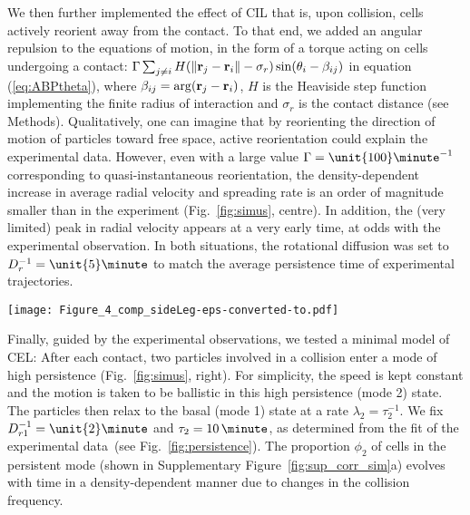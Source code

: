 \documentclass[11pt, twocolumn]{article}
\renewcommand\vec[1]{{\bf #1}}
\newcommand\rev[1]{{#1}}
\begin{document}
We then further implemented the effect of CIL that is, upon collision,
cells actively reorient away from the contact. To that end, we added
an angular repulsion to the equations of motion, in the form of a
torque \rev{acting on cells undergoing a contact:
  $\Gamma \sum_{j\neq i}H(\|\vec r_{j} - \vec
  r_{i}\|-\sigma_r)\sin(\theta_{i}-\beta_{ij})$
  in equation (\ref{eq:ABPtheta}), where
  $\beta_{ij}=\arg(\vec r_{j} - \vec r_{i})$, $H$ is the Heaviside
  step function implementing the finite radius of interaction
  and $\sigma_r$ is the contact distance (see Methods).} Qualitatively,
one can imagine that by reorienting the direction of motion of
particles toward free space, active reorientation could explain the
experimental data\cite{Mayor2010}. However, even with a large value
$\Gamma=\unit{100}\minute^{-1}$ corresponding to quasi-instantaneous
reorientation, the density-dependent increase in average radial
velocity and spreading rate is an order of magnitude smaller than in
the experiment (Fig.~\ref{fig:simus}, centre). In addition, the (very
limited) peak in radial velocity appears at a very early time, at odds
with the experimental observation. In both situations, the rotational
diffusion was set to $D_r^{-1}=\unit{5}\minute$ to match the average
persistence time of experimental trajectories.

\begin{figure*}[ht!]

\centering
\texttt{[image: Figure\_4\_comp\_sideLeg-eps-converted-to.pdf]}

\caption{Spreading colonies in a particle-based model mimicking the experiments.\\
  Radial velocity $\langle v_r\rangle$ (dashed lines, left axes) and
  colony radius $R_g$ (solid lines, right axes) in simulated colonies
  with different numbers of particles $N_0$ in the three models
  considered. The cartoons on the top row illustrate the different
  contact rules: Excluded-volume only (EV, left), excluded-volume and
  angular repulsion (EV\,+\,CIL, center), excluded-volume and contact
  enhancement of locomotion (EV\,+\,CEL, right). }
\label{fig:simus}
\end{figure*}

Finally, guided by the experimental observations, we tested a minimal
model of CEL: After each contact, two particles involved in a
collision enter a mode of high persistence (Fig.~\ref{fig:simus},
right). For simplicity, the speed is kept constant and the motion is taken to be ballistic in this
high persistence (mode 2) state.  The particles then relax to the
basal (mode 1) state at a rate $\lambda_2=\tau_2^{-1}$.  We fix
$D_{r1}^{-1}=\unit{2}\minute$ and $\tau_2=10\,\minute$, as determined
from the fit of the experimental data~(see
Fig.~\ref{fig:persistence}). The proportion $\phi_2$ of cells in the
persistent mode (shown in Supplementary Figure~\ref{fig:sup_corr_sim}a) evolves with time
in a density-dependent manner due to changes in the collision
frequency.
\end{document}
